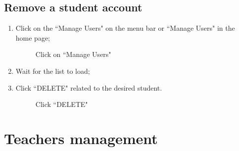 \documentclass[ManualeUtente]{subfiles}
\begin{document}
\subsection{Remove a student account}
\begin{enumerate}
	\item Click on the \textquotedblleft Manage Users" on the menu bar or \textquotedblleft Manage Users" in the home page;
	\begin{figure}[H]
		\centering
		\caption{Click on ``Manage Users"}
		\label{fig:Click on "Manage Users"}
	\end{figure}
	\item Wait for the list to load;
	\item Click \textquotedblleft DELETE" related to the desired student.
	\begin{figure}[H]
		\centering
		\caption{Click ``DELETE"}
		\label{fig:Click "DELETE"}
	\end{figure}
\end{enumerate}

\section{Teachers management}
\end{document}
